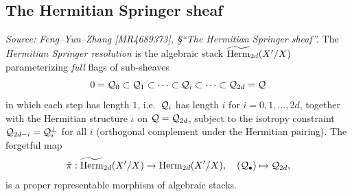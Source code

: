 \subsection{The Hermitian Springer sheaf}

\begin{definition}
  \label{def:herm-springer-resolution}
  \textit{Source: Feng--Yun--Zhang [MR4689373], \S``The Hermitian Springer sheaf''.}
  The \emph{Hermitian Springer resolution} is the algebraic stack
  \(\widetilde{\operatorname{Herm}}_{2d}(X'/X)\) parameterizing \emph{full} flags of sub-sheaves
  \[
    0 = \mathcal{Q}_0 \subset \mathcal{Q}_1 \subset \cdots \subset \mathcal{Q}_i \subset \cdots
      \subset \mathcal{Q}_{2d} = \mathcal{Q}
  \]
  in which each step has length \(1\), i.e.\ \(\mathcal{Q}_i\) has length \(i\) for
  \(i = 0, 1, \ldots, 2d\), together with the Hermitian structure \(\iota\) on
  \(\mathcal{Q} = \mathcal{Q}_{2d}\), subject to the isotropy constraint
  \(\mathcal{Q}_{2d-i} = \mathcal{Q}_i^{\bot}\) for all \(i\) (orthogonal complement under the
  Hermitian pairing). The forgetful map
  \[
    \tilde\pi : \widetilde{\operatorname{Herm}}_{2d}(X'/X) \to \operatorname{Herm}_{2d}(X'/X),
    \quad (\mathcal{Q}_\bullet) \mapsto \mathcal{Q}_{2d},
  \]
  is a proper representable morphism of algebraic stacks.
\end{definition}

